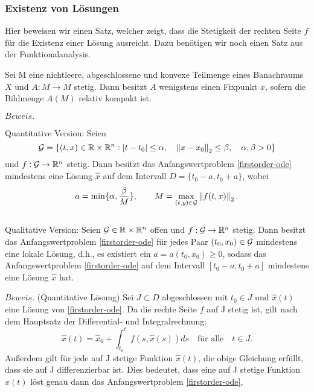 \subsubsection{Existenz von Lösungen}
Hier beweisen wir einen Satz, welcher zeigt, dass die Stetigkeit der rechten Seite $f$ für die Existenz einer
Lösung ausreicht. Dazu benötigen wir noch einen Satz aus der Funktionalanalysis.
\begin{satz}
    Sei M eine nichtleere, abgeschlossene und konvexe Teilmenge eines Banachraums $X$ und $A:M \rightarrow M$ stetig.
    Dann besitzt $A$ wenigstens einen Fixpunkt $x$, sofern die Bildmenge $A(M)$ relativ kompakt ist.
\end{satz}
$Beweis.$ \cite[13,14]{sundermeierFixpunktsatzSchauder}
\begin{satz}
\label{peano}
    Quantitative Version: Seien
    \[
            {\cal G}=\{(t,x) \in \mathbb{R} \times \mathbb{R}^{n}: |t-t_{0}| \leq \alpha, \quad
        \left\lVert x-x_{0} \right\rVert _{2} \leq\beta, \quad \alpha,\beta > 0 \}
    \]
    und $f:{\cal G} \rightarrow \mathbb{R}^{n}$ stetig. Dann besitzt das Anfangswertproblem \eqref{firstorder-ode}
    mindestens eine Lösung $\hat{x}$ auf dem Intervall $D=\{t_{0}-a,t_{0}+a\}$, wobei
    \[
        a=\min\{\alpha, \frac{\beta}{M}\}, \qquad M= \max_{(t,y)\in {\cal G}}\left\lVert f(t,x)\right\rVert_{2}.
    \]\\
    Qualitative Version: Seien ${\cal G}\in \mathbb{R} \times \mathbb{R}^{n}$ offen und $f:{\cal G} \rightarrow \mathbb{R}^{n}$ stetig.
    Dann besitzt das Anfangswertproblem \eqref{firstorder-ode} für jedes Paar $(t_{0},x_{0}) \in {\cal G}$ mindestens eine
    lokale Lösung, d.h., es existiert ein $a=a(t_{0},x_{0}) \geq 0$, sodass das Anfangswertproblem \eqref{firstorder-ode} auf
    dem Intervall $[t_{0}-a,t_{0}+a]$ mindestens eine Lösung $\hat{x}$ hat.
\end{satz}
$Beweis.$ (Quantitative Lösung) Sei $J\subset D$ abgeschlossen mit $t_0 \in J$ und $\hat{x}(t)$ eine Lösung von \eqref{firstorder-ode}.
Da die rechte Seite $f$ auf J stetig ist, gilt nach dem Hauptsatz der Differential- und Integralrechnung:
\[
    \hat{x}(t) = \hat{x}_0 + \int_{t_0}^{t} f(s, \hat{x}(s)) ds \quad \text{für alle} \quad t \in J.
\]
Außerdem gilt für jede auf J stetige Funktion $\hat{x}(t)$, die obige Gleichung erfüllt, dass sie auf J differenzierbar
ist. Dies bedeutet, dass eine auf J stetige Funktion $\hat{x}(t)$ löst genau dann das Anfangswertproblem \eqref{firstorder-ode},
